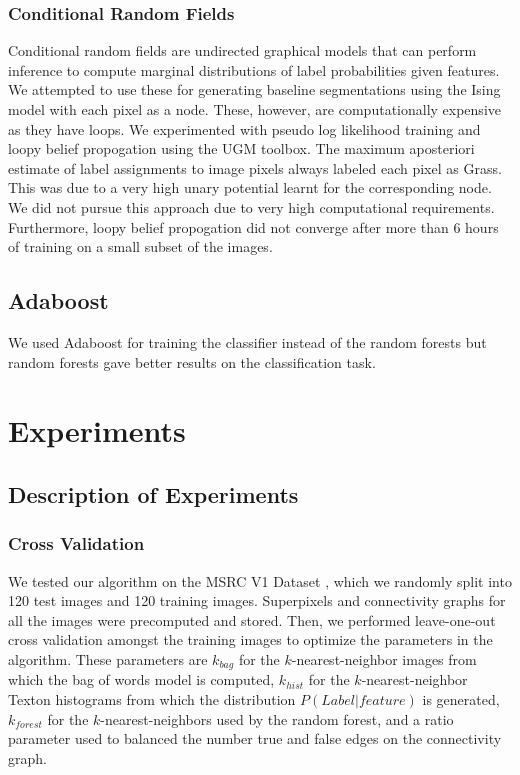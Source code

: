\documentclass{article} %
\begin{document}
\subsubsection{Conditional Random Fields}
Conditional random fields \cite{lafferty2001conditional} are undirected graphical models that can perform inference to compute marginal distributions of label probabilities given features.
We attempted to use these for generating baseline segmentations using the Ising model with each pixel as a node.
These, however, are computationally expensive as they have loops.
We experimented with pseudo log likelihood training and loopy belief propogation using the UGM toolbox\cite{UGMSoftware}.
The maximum aposteriori estimate of label assignments to image pixels always labeled each pixel as Grass.
This was due to a very high unary potential learnt for the corresponding node. 
We did not pursue this approach due to very high computational requirements.
Furthermore, loopy belief propogation did not converge after more than 6 hours of training on a small subset of the images.

\subsection{Adaboost}
We used Adaboost \cite{Freund96experimentswith} for training the classifier instead of the random forests but random forests gave better results on the classification task. 



\section{Experiments}
\label{sec:Exp}


\subsection{Description of Experiments}
\label{sec:Description}

\subsubsection{Cross Validation}
\label{sec:cross}
We tested our algorithm on the MSRC V1 Dataset \cite{MSRC}, which we randomly split into 120 test images and 120 training images.
Superpixels and connectivity graphs for all the images were precomputed and stored.
Then, we performed leave-one-out cross validation amongst the training images to optimize the parameters in the algorithm.
These parameters are $k_{bag}$ for the $k$-nearest-neighbor images from which the bag of words model is computed, $k_{hist}$ for the $k$-nearest-neighbor Texton histograms from which the distribution $P(Label | feature)$ is generated, $k_{forest}$ for the $k$-nearest-neighbors used by the random forest, and a ratio parameter used to balanced the number true and false edges on the connectivity graph. 
\end{document}
